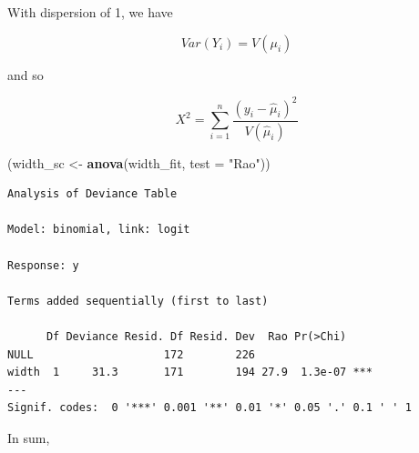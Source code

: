\documentclass[]{book}
\newenvironment{Shaded}{\begin{snugshade}}{\end{snugshade}}
\newcommand{\DataTypeTok}[1]{\textcolor[rgb]{0.13,0.29,0.53}{#1}}
\newcommand{\KeywordTok}[1]{\textcolor[rgb]{0.13,0.29,0.53}{\textbf{#1}}}
\newcommand{\NormalTok}[1]{#1}
\newcommand{\StringTok}[1]{\textcolor[rgb]{0.31,0.60,0.02}{#1}}
\begin{document}
With dispersion of 1, we have

\[Var(Y_i) = V(\mu_i)\]

and so

\[X^2 = \sum_{i = 1}^n\frac{(y_i - \hat\mu_i)^2}{V(\hat\mu_i)}\]

\begin{Shaded}
\begin{Highlighting}[]
\NormalTok{(width_sc <-}\StringTok{ }\KeywordTok{anova}\NormalTok{(width_fit, }\DataTypeTok{test =} \StringTok{"Rao"}\NormalTok{))}
\end{Highlighting}
\end{Shaded}

\begin{verbatim}
Analysis of Deviance Table

Model: binomial, link: logit

Response: y

Terms added sequentially (first to last)

      Df Deviance Resid. Df Resid. Dev  Rao Pr(>Chi)    
NULL                    172        226                  
width  1     31.3       171        194 27.9  1.3e-07 ***
---
Signif. codes:  0 '***' 0.001 '**' 0.01 '*' 0.05 '.' 0.1 ' ' 1
\end{verbatim}

In sum,
\end{document}

